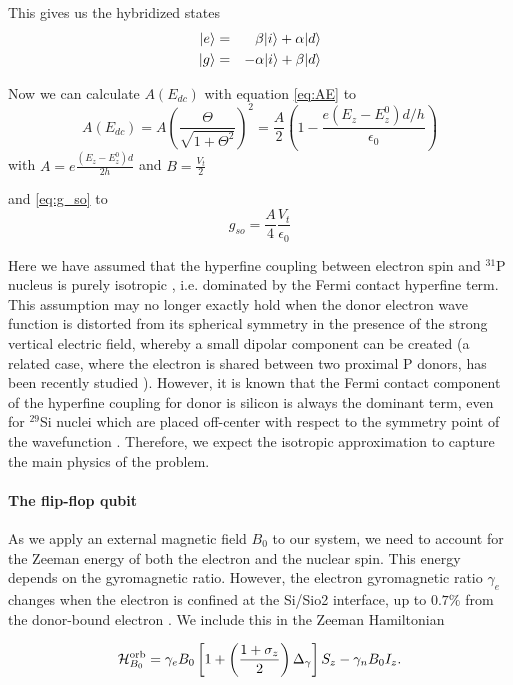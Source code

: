 This gives us the hybridized states 
\begin{eqnarray}\label{eq:hybridstates}
|e\rangle&=&\beta |i\rangle+\alpha|d\rangle\\
|g\rangle&=&-\alpha |i\rangle+\beta |d\rangle
\end{eqnarray}


Now we can calculate $A(E_{dc})$ with equation \eqref{eq:AE} to
\begin{equation}
A(E_{dc})=A\left(\frac{\Theta}{\sqrt{1+\Theta^2}}\right)^2=\frac{A}{2}\left(1-\frac{e\left(E_z-E_z^0\right)d/h}{\epsilon_0}\right)
\end{equation}
with $A=e\frac{\left(E_z-E_z^0\right)d}{2h}$ and $B=\frac{V_t}{2}$ 

and \eqref{eq:g_so} to
\begin{equation}
g_{so}=\frac{A}{4}\frac{V_t}{\epsilon_0}
\end{equation}

Here we have assumed that the hyperfine coupling between electron spin and $^{31}$P nucleus is purely isotropic \cite{Feher1959}, i.e. dominated by the Fermi contact hyperfine term. This assumption may no longer exactly hold when the donor electron wave function is distorted from its spherical symmetry in the presence of the strong vertical electric field, whereby a small dipolar component can be created (a related case, where the electron is shared between two proximal P donors, has been recently studied \cite{Hile2018}). However, it is known that the Fermi contact component of the hyperfine coupling for donor is silicon is always the dominant term, even for $^{29}$Si nuclei which are placed off-center with respect to the symmetry point of the wavefunction \cite{Ivey1975}. Therefore, we expect the isotropic approximation to capture the main physics of the problem.


\paragraph{The flip-flop qubit}

As we apply an external magnetic field $B_0$ to our system, we need to account for the Zeeman energy of both the electron and the nuclear spin. This energy depends on the gyromagnetic ratio. However, the electron gyromagnetic ratio $\gamma_e$ changes when the electron is confined at the Si/Sio2 interface, up to $0.7\%$ from the donor-bound electron \cite{Rahman2009}. We include this in the Zeeman Hamiltonian

\begin{equation} \label{eq:H_Zeeman_orb}
\mathcal{H}_{B_0}^{\rm orb}=\gamma_e B_0\left[1+\left(\frac{1+\sigma_z}{2}\right)\Delta_\gamma\right]S_z - \gamma_n B_0 I_z.
\end{equation}

